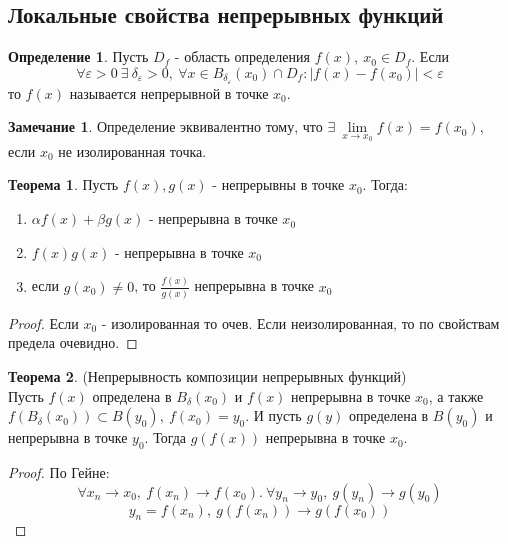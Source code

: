 \documentclass[a4paper, 12pt]{article}
\renewcommand{\epsilon}{\varepsilon}
\theoremstyle{definition}
\newtheorem*{definition}{Определение}
\newtheorem*{theorem}{Теорема}
\newtheorem*{comm}{Замечание}
\begin{document}
    \subsection{Локальные свойства непрерывных функций}
        \begin{definition}
            Пусть $D_f$ - область определения $f(x),\ x_0\in D_f$. Если 
            \[\forall \epsilon>0\ \exists\ \delta_{\epsilon}>0,\ \forall x\in B_{\delta_{\epsilon}}(x_0)\cap D_f: |f(x)-f(x_0)|<\epsilon\] 
            то $f(x)$ называется непрерывной в точке $x_0$.
        \end{definition}  
        \begin{comm}
            Определение эквивалентно тому, что $\exists\ \lim\limits_{x\to x_0}f(x)=f(x_0)$, если $x_0$ не изолированная точка.
        \end{comm} 
        \begin{theorem}
            Пусть $f(x),g(x)$ - непрерывны в точке $x_0$. Тогда:
            \begin{enumerate}
                \item $\alpha f(x)+\beta g(x)$ - непрерывна в точке $x_0$
                \item $f(x)g(x)$ - непрерывна в точке $x_0$
                \item если $g(x_0)\ne 0$, то $\frac{f(x)}{g(x)}$ непрерывна в точке $x_0$
            \end{enumerate}
        \end{theorem} 
        \begin{proof}
            Если $x_0$ - изолированная то очев. Если неизолированная, то по свойствам предела очевидно.
        \end{proof} 
        \begin{theorem} (Непрерывность композиции непрерывных функций) \\
            Пусть $f(x)$ определена в $B_{\delta}(x_0)$ и $f(x)$ непрерывна в точке $x_0$, а также\\
            $f(B_{\delta}(x_0))\subset B(y_0),\ f(x_0)=y_0$. И пусть $g(y)$ определена в $B(y_0)$ и непрерывна в точке $y_0$. Тогда $g(f(x))$ непрерывна в точке $x_0$.
        \end{theorem} 
        \begin{proof} По Гейне:
            \[\forall x_n\to x_0,\ f(x_n)\to f(x_0).\ \forall y_n\to y_0,\ g(y_n)\to g(y_0)\]
            \[y_n=f(x_n),\ g(f(x_n))\to g(f(x_0))\]
        \end{proof} 
\end{document}
